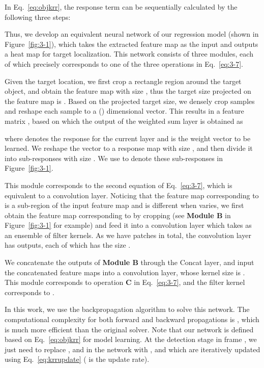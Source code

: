 \documentclass[10pt,twocolumn,letterpaper]{article}
\begin{document}
In Eq.~\ref{eq:objkrr}, the response term  can be sequentially calculated by the
following three steps:

Thus, we develop an equivalent neural network of our regression model (shown in
Figure~\ref{fig:3-1}), which takes the extracted feature map as the input and
outputs a heat map for target localization. This network consists of three modules,
each of which precisely corresponds to one of the three operations in Eq.~\ref{eq:3-7}.


Given the target location, we first crop a rectangle region around the target object,
and obtain the feature map  with size
, thus the target size projected on the feature map is . Based on the projected target size, we densely
crop samples and reshape each sample to a  () dimensional vector.
This results in a feature matrix , based on which the
output of the weighted sum layer is obtained as
\begin{small}

\end{small}
where  denotes the response for the current layer and
 is the weight vector to be learned. We reshape the vector  to
a response map with size , and then divide it into 
sub-responses with size . We use 
to denote these sub-responses in Figure~\ref{fig:3-1}.

\vspace{1mm}
This module corresponds to the second equation of Eq.~\ref{eq:3-7},
which is equivalent to a convolution layer.
Noticing that the feature map corresponding to  is a sub-region of
the input feature map  and is different when  varies, we
first obtain the feature
map corresponding to  by cropping  (see \textbf{Module B} in
Figure~\ref{fig:3-1} for example) and feed it into a convolution
layer which takes  as an ensemble of filter kernels.
As we have  patches in total, the convolution layer has  outputs, each of which has
the size .

\vspace{1mm}
We concatenate the  outputs of \textbf{Module B} through the
Concat layer, and input the concatenated feature maps into a convolution layer, whose kernel
size is . This module corresponds to operation \textbf{C} in Eq.~\ref{eq:3-7},
and the filter kernel corresponds to .

In this work, we use the backpropagation algorithm to solve this network. The computational complexity
for both forward and backward propagations is , which is much more efficient than the
original solver.
Note that our network is defined based on Eq.~\ref{eq:objkrr} for model learning.
At the detection stage in frame , we just need to replace ,  and
 in the network with ,  and  which are iteratively updated using Eq.~\ref{eq:krrupdate} ( is the update rate).
\end{document}
